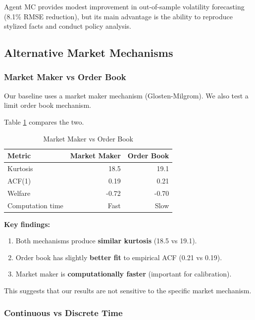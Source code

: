 Agent MC provides modest improvement in out-of-sample volatility forecasting (8.1\% RMSE reduction), but its main advantage is the ability to reproduce stylized facts and conduct policy analysis.

\subsection{Alternative Market Mechanisms}

\subsubsection{Market Maker vs Order Book}

Our baseline uses a market maker mechanism (Glosten-Milgrom). We also test a limit order book mechanism.

Table \ref{tab:market} compares the two.

\begin{table}[ht]
\centering
\caption{Market Maker vs Order Book}
\label{tab:market}
\begin{tabular}{lrr}
\hline\hline
Metric & Market Maker & Order Book \\
\hline
Kurtosis & 18.5 & 19.1 \\
ACF(1) & 0.19 & 0.21 \\
Welfare & -0.72 & -0.70 \\
Computation time & Fast & Slow \\
\hline\hline
\end{tabular}
\end{table}

\textbf{Key findings:}

\begin{enumerate}
    \item Both mechanisms produce \textbf{similar kurtosis} (18.5 vs 19.1).
    
    \item Order book has slightly \textbf{better fit} to empirical ACF (0.21 vs 0.19).
    
    \item Market maker is \textbf{computationally faster} (important for calibration).
\end{enumerate}

This suggests that our results are not sensitive to the specific market mechanism.

\subsubsection{Continuous vs Discrete Time}

